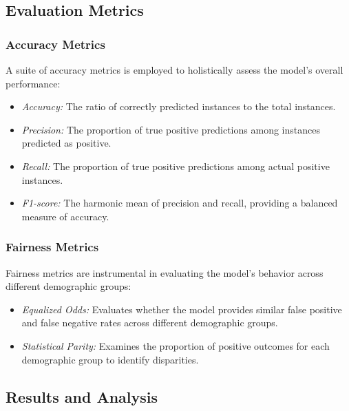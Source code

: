 \documentclass[12pt,a4paper,openright,twoside]{book}
\begin{document}
\subsection{Evaluation Metrics}

\subsubsection{Accuracy Metrics}

A suite of accuracy metrics is employed to holistically assess the model's overall performance:

\begin{itemize}
    \item \emph{Accuracy:} The ratio of correctly predicted instances to the total instances.
    
    \item \emph{Precision:} The proportion of true positive predictions among instances predicted as positive.
    
    \item \emph{Recall:} The proportion of true positive predictions among actual positive instances.
    
    \item \emph{F1-score:} The harmonic mean of precision and recall, providing a balanced measure of accuracy.
\end{itemize}

\subsubsection{Fairness Metrics}

Fairness metrics are instrumental in evaluating the model's behavior across different demographic groups:

\begin{itemize}
    
    \item \emph{Equalized Odds:} Evaluates whether the model provides similar false positive and false negative rates across different demographic groups.
    
    \item \emph{Statistical Parity:} Examines the proportion of positive outcomes for each demographic group to identify disparities.
\end{itemize}

\subsection{Results and Analysis}
\end{document}
